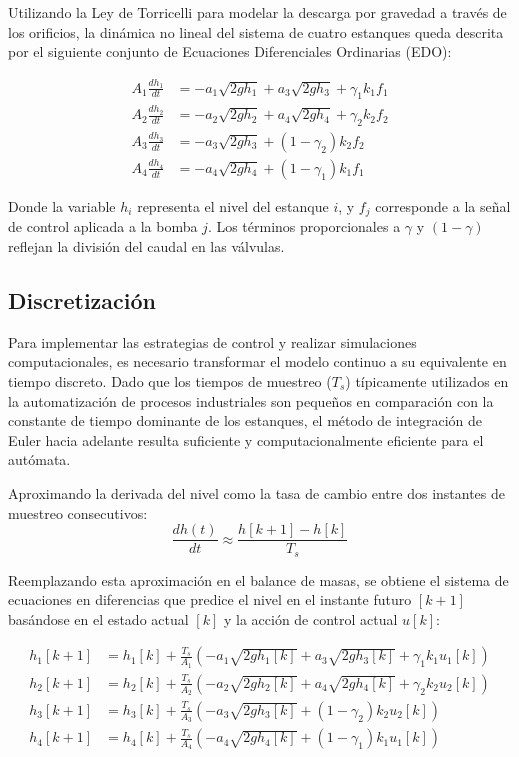Utilizando la Ley de Torricelli para modelar la descarga por gravedad a través de los orificios, la dinámica no lineal del sistema de cuatro estanques queda descrita por el siguiente conjunto de Ecuaciones Diferenciales Ordinarias (EDO):

\begin{align}
    A_1 \frac{dh_1}{dt} &= -a_1 \sqrt{2g h_1} + a_3 \sqrt{2g h_3} + \gamma_1 k_1 f_1 \label{eq:edo_h1} \\
    A_2 \frac{dh_2}{dt} &= -a_2 \sqrt{2g h_2} + a_4 \sqrt{2g h_4} + \gamma_2 k_2 f_2 \label{eq:edo_h2} \\
    A_3 \frac{dh_3}{dt} &= -a_3 \sqrt{2g h_3} + (1-\gamma_2) k_2 f_2 \label{eq:edo_h3} \\
    A_4 \frac{dh_4}{dt} &= -a_4 \sqrt{2g h_4} + (1-\gamma_1) k_1 f_1 \label{eq:edo_h4}
\end{align}

Donde la variable $h_i$ representa el nivel del estanque $i$, y $f_j$ corresponde a la señal de control aplicada a la bomba $j$. Los términos proporcionales a $\gamma$ y $(1-\gamma)$ reflejan la división del caudal en las válvulas.

\subsection{Discretización} %

Para implementar las estrategias de control y realizar simulaciones computacionales, es necesario transformar el modelo continuo a su equivalente en tiempo discreto. Dado que los tiempos de muestreo ($T_s$) típicamente utilizados en la automatización de procesos industriales son pequeños en comparación con la constante de tiempo dominante de los estanques, el método de integración de Euler hacia adelante resulta suficiente y computacionalmente eficiente para el autómata.

Aproximando la derivada del nivel como la tasa de cambio entre dos instantes de muestreo consecutivos:
\begin{equation}
    \frac{dh(t)}{dt} \approx \frac{h[k+1] - h[k]}{T_s}
\end{equation}

Reemplazando esta aproximación en el balance de masas, se obtiene el sistema de ecuaciones en diferencias que predice el nivel en el instante futuro $[k+1]$ basándose en el estado actual $[k]$ y la acción de control actual $u[k]$:

\begin{align}
    h_1[k+1] &= h_1[k] + \frac{T_s}{A_1} \left( -a_1 \sqrt{2g h_1[k]} + a_3 \sqrt{2g h_3[k]} + \gamma_1 k_1 u_1[k] \right) \label{eq:disc_h1} \\
    h_2[k+1] &= h_2[k] + \frac{T_s}{A_2} \left( -a_2 \sqrt{2g h_2[k]} + a_4 \sqrt{2g h_4[k]} + \gamma_2 k_2 u_2[k] \right) \label{eq:disc_h2} \\
    h_3[k+1] &= h_3[k] + \frac{T_s}{A_3} \left( -a_3 \sqrt{2g h_3[k]} + (1-\gamma_2) k_2 u_2[k] \right) \label{eq:disc_h3} \\
    h_4[k+1] &= h_4[k] + \frac{T_s}{A_4} \left( -a_4 \sqrt{2g h_4[k]} + (1-\gamma_1) k_1 u_1[k] \right) \label{eq:disc_h4}
\end{align}

